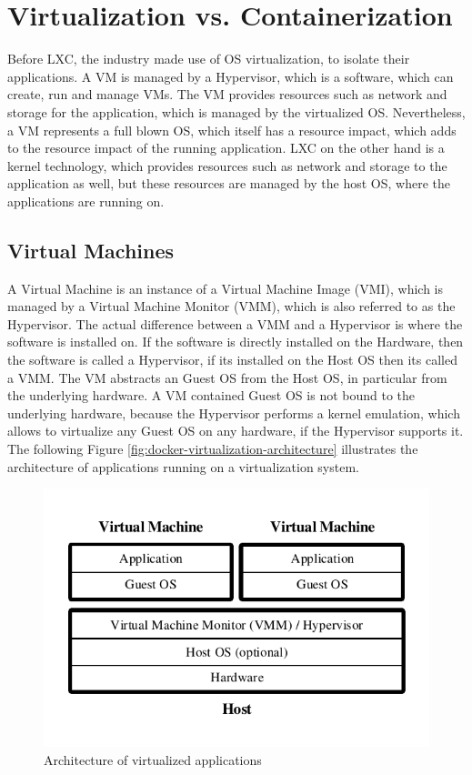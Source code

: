 \section{Virtualization vs. Containerization}
\label{sec:docker-virtualization-vs-containerization}
Before LXC, the industry made use of OS virtualization, to isolate their applications. A VM is managed by a Hypervisor, which is a software, which can create, run and manage VMs. The VM provides resources such as network and storage for the application, which is managed by the virtualized OS. Nevertheless, a VM represents a full blown OS, which itself has a resource impact, which adds to the resource impact of the running application. LXC on the other hand is a kernel technology, which provides resources such as network and storage to the application as well, but these resources are managed by the host OS, where the applications are running on.

\subsection{Virtual Machines}
\label{sec:docker-virtual-machines}
A Virtual Machine is an instance of a Virtual Machine Image (VMI), which is managed by a Virtual Machine Monitor (VMM), which is also referred to as the Hypervisor. The actual difference between a VMM and a Hypervisor is where the software is installed on. If the software is directly installed on the Hardware, then the software is called a Hypervisor, if its installed on the Host OS then its called a VMM. The VM abstracts  an Guest OS from the Host OS, in particular from the underlying hardware. A VM contained Guest OS is not bound to the underlying hardware, because the Hypervisor performs a kernel emulation, which allows to virtualize any Guest OS on any hardware, if the Hypervisor supports it. The following Figure \vref{fig:docker-virtualization-architecture} illustrates the architecture of applications running on a virtualization system.

\begin{figure}[htbp]
	\centering
	\includegraphics[scale=1]{images/docker-virtualization-architecture.pdf}
	\caption{Architecture of virtualized applications}
	\label{fig:docker-virtualization-architecture}
\end{figure} 

